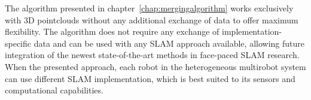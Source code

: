 The algorithm presented in chapter~\ref{chap:mergingalgorithm} works exclusively with 3D pointclouds without any additional exchange of data to offer maximum flexibility. The algorithm does not require any exchange of implementation-specific data and can be used with any \gls{SLAM} approach available, allowing future integration of the newest state-of-the-art methods in face-paced \gls{SLAM} research. When the presented approach, each robot in the heterogeneous multirobot system can use different \gls{SLAM} implementation, which is best suited to its sensors and computational capabilities.






